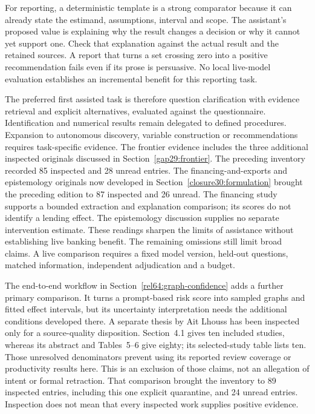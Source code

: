 For reporting, a deterministic template is a strong comparator because
it can already state the estimand, assumptions, interval and scope.
The assistant's proposed value is explaining why the result changes a
decision or why it cannot yet support one. Check that explanation
against the actual result and the retained sources. A report that turns
a set crossing zero into a positive recommendation fails even if its
prose is persuasive. No local live-model evaluation establishes an
incremental benefit for this reporting task.

The preferred first assisted task is therefore question clarification
with evidence retrieval and explicit alternatives, evaluated against
the questionnaire. Identification and numerical results remain delegated
to defined procedures. Expansion to autonomous discovery, variable
construction or recommendations requires task-specific evidence. The
frontier evidence includes the three additional inspected originals discussed
in Section~\ref{gap29:frontier}. The preceding inventory recorded 85 inspected
and 28 unread entries. The financing-and-exports and epistemology originals
now developed in Section~\ref{closure30:formulation} brought the preceding edition to
87 inspected and 26 unread. The financing study supports a bounded extraction
and explanation comparison; its scores do not identify a lending effect.
The epistemology discussion supplies no separate intervention estimate. These
readings sharpen the limits of assistance without establishing live banking
benefit. The remaining omissions still limit broad claims. A live comparison
requires a fixed model version, held-out questions, matched information,
independent adjudication and a budget.~\citep{rel18li,rel18mugleston}

The end-to-end workflow in Section~\ref{rel64:graph-confidence} adds a
further primary comparison. It turns a prompt-based risk score into sampled
graphs and fitted effect intervals, but its uncertainty interpretation needs
the additional conditions developed there. A separate thesis by Ait Lhouss
has been inspected only for a source-quality disposition. Section~4.1 gives
ten included studies, whereas its abstract and Tables~5--6 give eighty; its
selected-study table lists ten. Those unresolved denominators prevent using
its reported review coverage or productivity results here. This is an
exclusion of those claims, not an allegation of intent or formal retraction.
That comparison brought the inventory to 89 inspected entries, including
this one explicit quarantine, and 24 unread entries. Inspection does not
mean that every inspected work supplies positive evidence. \citep{rel64molero,rel64aitlhouss}

